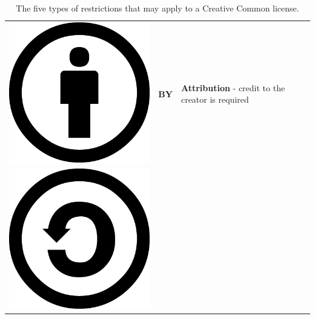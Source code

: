 \begin{table}[]
\centering
\caption{The five types of restrictions that may apply to a Creative Common license.}
\label{table_5}
\begin{tabular}{p{1cm} p{1cm} p{10cm}}
\hline
    \begin{minipage}{.1\textwidth}
      \includegraphics[scale=.07]{images/cc_by.png}
    \end{minipage} & \textbf{BY} & \textbf{Attribution} - credit to the creator is required                                                                                                             
    \\
 \begin{minipage}{.1\textwidth}
      \includegraphics[scale=.07]{images/cc_sa.png}

\end{minipage}
\end{tabular}
\end{table}

